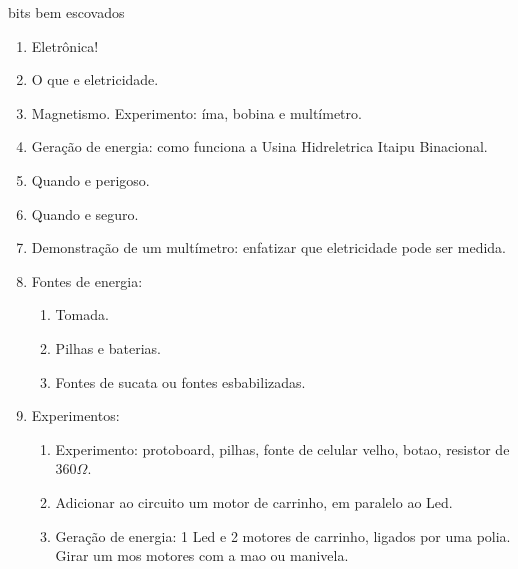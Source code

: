 {\Huge bits bem escovados}

\begin{enumerate}
	\item Eletrônica!
	\item O que e eletricidade.
	\item Magnetismo. Experimento: íma, bobina e multímetro.
	\item Geração de energia: como funciona a Usina Hidreletrica Itaipu Binacional.
	\item Quando e perigoso.
	\item Quando e seguro.
	\item Demonstração de um multímetro: enfatizar que eletricidade pode ser medida.
	\item Fontes de energia:
	\begin{enumerate}
		\item Tomada.
		\item Pilhas e baterias.
	\item Fontes de sucata ou fontes esbabilizadas.
	\end{enumerate}
	\item Experimentos:
	\begin{enumerate}
		\item Experimento: protoboard, pilhas, fonte de celular velho, botao, resistor de 360$\Omega$.
		\item Adicionar ao circuito um motor de carrinho, em paralelo ao Led.	
		\item Geração de energia: 1 Led e 2 motores de carrinho, ligados por uma polia. Girar um mos motores com a mao ou manivela.
	\end{enumerate}
\end{enumerate}
